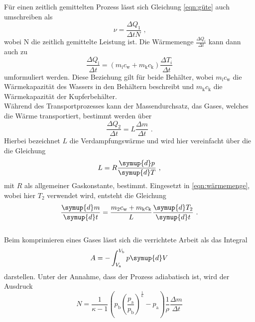 \noindent Für einen zeitlich gemittelten Prozess lässt sich Gleichung \ref{eqn:güte} auch umschreiben als
\begin{equation}
    \nu=\frac{\Delta Q_1}{\Delta tN} \text{ ,}
    \label{eqn:gütemittel}
\end{equation}
wobei N die zeitlich gemittelte Leistung ist. Die Wärmemenge $\frac{\Delta Q_i}{\Delta t}$ kann dann auch zu
\begin{equation}
    \frac{\Delta Q_{\mathrm{i}}}{\Delta t}=(m_{\mathrm{i}}c_{\mathrm{w}}+m_{\mathrm{k}}c_{\mathrm{k}})\frac{\Delta T_i}{\Delta t}
    \label{eqn:wärmemenge}
\end{equation}
umformuliert werden. Diese Beziehung gilt für beide Behälter, wobei $m_{\mathrm{i}}c_{\mathrm{w}}$ die Wärmekapazität des Wassers
in den Behältern beschreibt und $m_{\mathrm{k}}c_{\mathrm{k}}$ die Wärmekapazität der Kupferbehälter.\\

\noindent Während des Transportprozesses kann der Massendurchsatz, das Gases, welches die
Wärme transportiert, bestimmt werden über
\begin{equation}
    \frac{\Delta Q_2}{\Delta t}=L\frac{\Delta m}{\Delta t} \text{ .}
\end{equation}
Hierbei bezeichnet $L$ die Verdampfungswärme und wird hier vereinfacht über die die Gleichung
\begin{equation}
    L=R\frac{\symup{d}p}{\symup{d}T} \text{ ,}
\end{equation}
mit $R$ als allgemeiner Gaskonstante, bestimmt. Eingesetzt in \ref{eqn:wärmemenge}, wobei hier $T_2$ verwendet wird, 
entsteht die Gleichung
\begin{equation}
    \frac{\symup{d}m}{\symup{d}t}=\frac{m_2c_{\mathrm{w}}+m_{\mathrm{k}}c_{\mathrm{k}}}{L}\frac{\symup{d}T_2}{\symup{d}t} \text{ .}
    \label{eqn:masse}
\end{equation}
\\

\noindent Beim komprimieren eines Gases lässt sich die verrichtete Arbeit als das Integral
\begin{equation}
    A=-\int_{V_{\mathrm{a}}}^{V_{\mathrm{b}}}p \symup{d}V
\end{equation}
darstellen. Unter der Annahme, dass der Prozess adiabatisch ist, wird der Ausdruck
\begin{equation}
    N=\frac{1}{\kappa -1}\left(p_{\mathrm{b}}\left(\frac{p_{\mathrm{a}}}{p_{\mathrm{b}}}\right)^{\frac{1}{\kappa}}-p_{\mathrm{a}}\right)\frac{1}{\rho}\frac{\Delta m}{\Delta t}
    \label{eqn:leistung}
\end{equation}